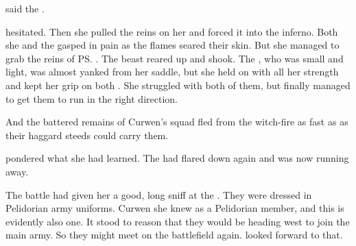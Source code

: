  said the \meccaran. 


\Tsekkect{} hesitated. 
Then she pulled the reins on her \relc{} and forced it into the inferno. 
Both she and the \relc{} gasped in pain as the flames seared their skin. 
But she managed to grab the reins of \ps{\Shireyo}{} \relc. 
The beast reared up and shook. 
The \meccaran, who was small and light, was almost yanked from her saddle, but she held on with all her strength and kept her grip on both \relcs. 
She struggled with both of them, but finally managed to get them to run in the right direction. 


And the battered remains of Curwen's squad fled from the witch-fire as fast as as their haggard steeds could carry them. 







\begin{comment}
\subsection{\Takestsha{} ponders \vertex}
\end{comment}
\new
\Takestsha{} pondered what she had learned. 
The \vertex{} had flared down again and was now running away. 


The battle had given her a good, long sniff at the \humans. 
They were dressed in Pelidorian army uniforms. 
Curwen she knew as a Pelidorian \ishrah{} member, and this \Shireyo{} is  evidently also one. 
It stood to reason that they would be heading west to join the main army. 
So they might meet on the battlefield again. 
\Takestsha{} looked forward to that. 

